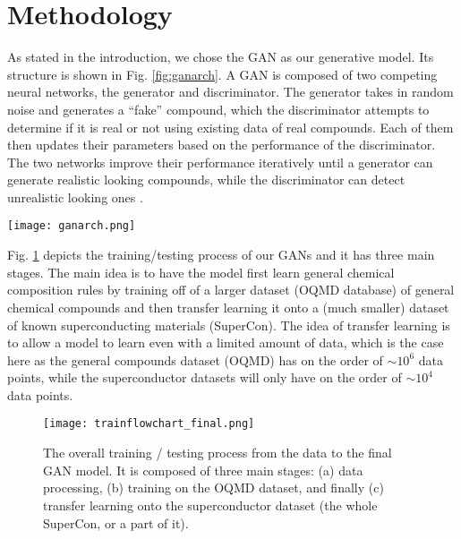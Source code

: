 \section{Methodology}
\label{methodology}

As stated in the introduction, we chose the GAN as our generative model. Its structure is shown in Fig. \ref{fig:ganarch}. A GAN is composed of two competing neural networks, the generator and discriminator. The generator takes in random noise and generates a ``fake'' compound, which the discriminator attempts to determine if it is real or not using existing data of real compounds. Each of them then updates their parameters based on the performance of the discriminator. The two networks improve their performance iteratively until a generator can generate realistic looking compounds, while the discriminator can detect unrealistic looking ones \cite{goodfellow2014}.

\begin{figure*}
        \centering
        \texttt{[image: ganarch.png]}
        \caption{The architecture of the GAN model used. Y$_{1.2}$Ba$_{0.8}$CuO$_4$ and O$_{7.25}$Ca$_{0.62}$Cu$_{2.13}$Sr$_{1.91}$Y$_{0.37}$Bi$_{1.71}$ 
        are examples of real (from SuperCon) and ``fake'' superconductors, respectively. }
        \label{fig:ganarch}
    \end{figure*}
    
    
    
Fig. \ref{fig:trainflowchart} depicts the training/testing process of our GANs and it has three main stages. The main idea is to have the model first learn general chemical composition rules by training off of a larger dataset (OQMD database) of general chemical compounds and then transfer learning it onto a (much smaller) dataset of known superconducting materials (SuperCon). The idea of transfer learning is to allow a model to learn even with a limited amount of data, which is the case here as the general compounds dataset (OQMD) has on the order of $\sim 10^6$ data points, while the superconductor datasets will only have on the order of $\sim 10^4$ data points.

\begin{figure}
    \centering
    \texttt{[image: trainflowchart\_final.png]}
    \caption{The overall training / testing process from the data to the final GAN model. It is composed of three main stages: (a) data processing, (b) training on the OQMD dataset, and finally (c) transfer learning onto the superconductor dataset (the whole SuperCon, or a part of it).}
    \label{fig:trainflowchart}
\end{figure}

